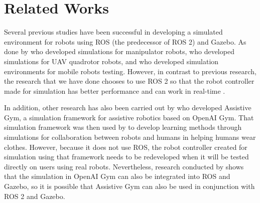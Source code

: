 \section{Related Works}
\label{sec:relatedworks}

Several previous studies have been successful in developing a simulated environment for robots using ROS (the predecessor of ROS 2) and Gazebo.
As done by \citet{qian2014} who developed simulations for manipulator robots,
   \citet{zhang2015} who developed simulations for UAV quadrotor robots,
   and \citet{takaya2016} who developed simulation environments for mobile robots testing.
However, in contrast to previous research,
  the research that we have done chooses to use ROS 2 so that the robot controller made for simulation has better performance and can work in real-time \citep{maruyama2016}.

In addition,
  other research has also been carried out by \citet{erickson2020} who developed Assistive Gym,
  a simulation framework for assistive robotics based on OpenAI Gym.
That simulation framework was then used by \citet{clegg2020} to develop learning methods through simulations for collaboration between robots and humans in helping humans wear clothes.
However, because it does not use ROS,
  the robot controller created for simulation using that framework needs to be redeveloped when it will be tested directly on users using real robots.
Nevertheless, research conducted by \citet{zamora2016} shows that the simulation in OpenAI Gym can also be integrated into ROS and Gazebo,
  so it is possible that Assistive Gym can also be used in conjunction with ROS 2 and Gazebo.
